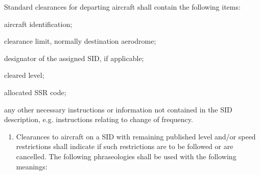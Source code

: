 \begin{enumeratesc}
    \begin{enumempty}
        \item Standard clearances for departing aircraft shall contain the following items:
    \end{enumempty}
    \begin{enumalph}
        \item aircraft identification;
        \item clearance limit, normally destination aerodrome;
        \item designator of the assigned SID, if applicable;
        \item cleared level;
        \item allocated SSR code;
        \item any other necessary instructions or information not contained in the SID description, e.g. instructions relating to change of frequency.
    \end{enumalph}
    \begin{enumempty}[labelindent=\parindent]
        \item {}
        \item {}
    \end{enumempty}

    \begin{enumerate}
        \item \label{6.3.2.4.1} Clearances to aircraft on a SID with remaining published level and/or speed restrictions shall indicate if such restrictions are to be followed or are cancelled. The following phraseologies shall be used with the following meanings:

\end{enumerate}
\end{enumeratesc}
